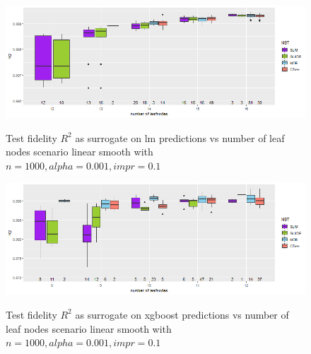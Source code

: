 \begin{figure}
\caption{Test fidelity $R^2$ as surrogate on lm predictions vs number of leaf nodes scenario linear smooth with $n=1000, alpha = 0.001, impr = 0.1$}
    \includegraphics[width=16cm]{Figures/simulations/batchtools/basic_scenarios/linear_smooth/ls_1000_lm_r2_test.png}
    \label{fig:ls_1000_lm_r2_test}
\end{figure} 

\begin{figure}
\caption{Test fidelity $R^2$ as surrogate on xgboost predictions vs number of leaf nodes scenario linear smooth with $n=1000, alpha = 0.001, impr = 0.1$}
    \includegraphics[width=16cm]{Figures/simulations/batchtools/basic_scenarios/linear_smooth/ls_1000_xgboost_r2_test.png}
    \label{fig:ls_1000_xgboost_r2_test}
\end{figure} 



